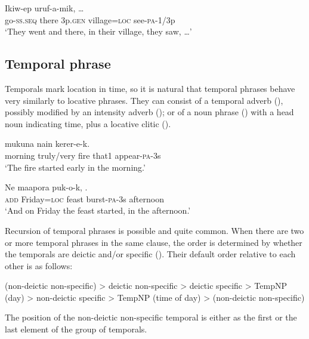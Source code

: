 \ea%
\label{ex:4:x869}
\gll Ikiw-ep      uruf-a-mik,  {\dots }\\
   go-\textsc{ss}.\textsc{seq}  there  3p.\textsc{gen}  village=\textsc{loc}  see-\textsc{pa}-1/3p   \\
\glt`They went and there, in their village, they saw, {\dots}'
\z

\subsection{Temporal phrase} \label{sec:4.6.2}
{}
Temporals mark location in time, so it is natural that temporal phrases behave very similarly to locative phrases.  They can consist of a temporal adverb (), possibly modified by an intensity adverb (); or of a noun phrase () with a head noun indicating time, plus a locative clitic ().

\ea%
\label{ex:4:x872}
\gll {}   mukuna  nain  kerer-e-k. \\
    morning  truly/very  fire  that1  appear-\textsc{pa}-3s  \\
\glt`The fire started early in the morning.'
\z

\ea%
\label{ex:4:x873}
\gll Ne    maapora  puk-o-k,  . \\
   \textsc{add}  Friday=\textsc{loc}  feast  burst-\textsc{pa}-3s  afternoon   \\
\glt`And on Friday the feast started, in the afternoon.'
\z

Recursion of temporal phrases is possible and quite common.  When there are two or more temporal phrases in the same clause, the order is determined by whether the temporals are deictic and/or specific ().  Their default order relative to each other is as follows:

(non-deictic non-specific) {{\textgreater}} deictic non-specific {{\textgreater}} deictic specific {{\textgreater}} TempNP (day) {{\textgreater}} non-deictic specific {{\textgreater}} TempNP (time of day) {{\textgreater}} (non-deictic non-specific)

The position of the non-deictic non-specific temporal is either as the first or the last element of the group of temporals.

